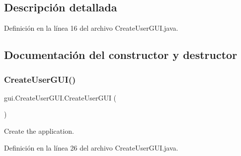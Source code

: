 \subsection{Descripción detallada}


Definición en la línea 16 del archivo Create\+User\+G\+U\+I.\+java.



\subsection{Documentación del constructor y destructor}
\mbox{\label{classgui_1_1CreateUserGUI_acadadd60afe0885fbe2930dd9e5b13e0}} 
\subsubsection{\texorpdfstring{CreateUserGUI()}{CreateUserGUI()}}
{\footnotesize\ttfamily gui.\+Create\+User\+G\+U\+I.\+Create\+User\+G\+UI (\begin{DoxyParamCaption}{ }\end{DoxyParamCaption})}

Create the application. 

Definición en la línea 26 del archivo Create\+User\+G\+U\+I.\+java.


